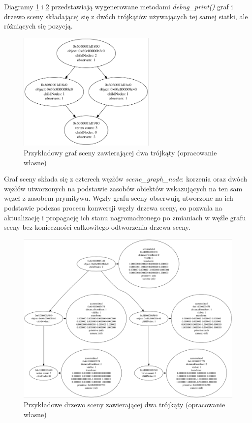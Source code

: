Diagramy \ref{triangles_scene_graph} i \ref{triangles_scene_tree} przedstawiają wygenerowane metodami \textit{debug\_print()} graf i drzewo sceny składającej się z dwóch trójkątów używających tej samej siatki, ale różniących się pozycją.
\begin{figure}[htbp]
	\centering
	\includegraphics[width=0.6\textwidth]{images/scene_graph.png}
	\caption{Przykładowy graf sceny zawierającej dwa trójkąty (opracowanie własne)}
	\label{triangles_scene_graph}
\end{figure}
Graf sceny składa się z czterech węzłów \textit{scene\_graph\_node}: korzenia oraz dwóch węzłów utworzonych na podstawie zasobów obiektów wskazujących na ten sam węzeł z zasobem prymitywu.
Węzły grafu sceny obserwują utworzone na ich podstawie podczas procesu konwersji węzły drzewa sceny, co pozwala na aktualizację i propagację ich stanu nagromadzonego po zmianiach w węźle grafu sceny bez konieczności całkowitego odtworzenia drzewa sceny.
\begin{figure}[htbp]
	\centering
	\includegraphics[width=1.0\textwidth]{images/scene_tree.png}
	\caption{Przykładowe drzewo sceny zawierającej dwa trójkąty (opracowanie własne)}
	\label{triangles_scene_tree}
\end{figure}
